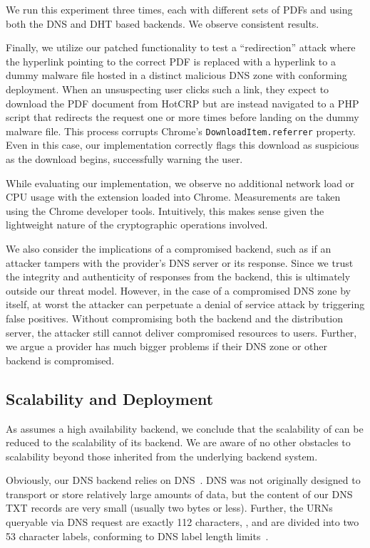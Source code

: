 We run this experiment three times, each with different sets of PDFs and using
both the DNS and DHT based backends. We observe consistent results.

Finally, we utilize our patched functionality to test a ``redirection'' attack
where the hyperlink pointing to the correct PDF is replaced with a hyperlink to
a dummy malware file hosted in a distinct malicious DNS zone with conforming
\SYSTEM{} deployment. When an unsuspecting user clicks such a link, they expect
to download the PDF document from HotCRP but are instead navigated to a PHP
script that redirects the request one or more times before landing on the dummy
malware file. This process corrupts Chrome's \texttt{DownloadItem.referrer}
property. Even in this case, our implementation correctly flags this download
as suspicious as the download begins, successfully warning the user.

While evaluating our implementation, we observe no additional network load or
CPU usage with the extension loaded into Chrome. Measurements are taken using
the Chrome developer tools. Intuitively, this makes sense given the lightweight
nature of the cryptographic operations involved.

We also consider the implications of a compromised backend, such as if an
attacker tampers with the provider's DNS server or its response. Since we trust
the integrity and authenticity of responses from the backend, this is ultimately
outside our threat model. However, in the case of a compromised DNS zone by
itself, at worst the attacker can perpetuate a denial of service attack by
triggering false positives. Without compromising both the backend and the
distribution server, the attacker still cannot deliver compromised resources to
users. Further, we argue a provider has much bigger problems if their DNS zone
or other backend is compromised.

\subsection{Scalability and Deployment}

As \SYSTEM{} assumes a high availability backend, we conclude that the
scalability of \SYSTEM{} can be reduced to the scalability of its backend. We
are aware of no other obstacles to scalability beyond those inherited from the
underlying backend system.

Obviously, our DNS backend relies on DNS~\cite{DNS1}. DNS was not originally
designed to transport or store relatively large amounts of data, but the content
of our DNS TXT records are very small (usually two bytes or less). Further, the
URNs queryable via DNS request are exactly 112 characters, , and are divided into two 53 character labels, conforming to
DNS label length limits~\cite{DNS2}.

